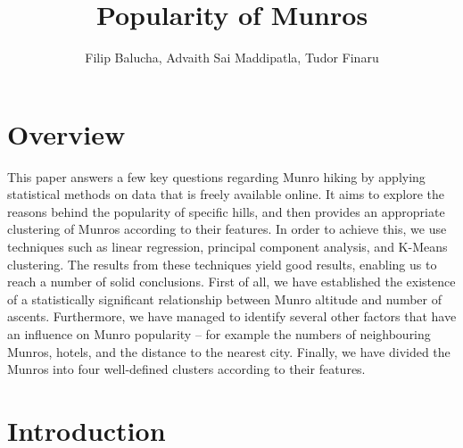 \documentclass[11pt,a4paper]{article}
\title{Popularity of Munros}
\author{Filip Balucha, Advaith Sai Maddipatla, Tudor Finaru}
\begin{document}
\maketitle


\section{Overview}
This paper answers a few key questions regarding Munro hiking by applying statistical methods on data that is freely available online. It aims to explore the reasons behind the popularity of specific hills, and then provides an appropriate clustering of Munros according to their features. In order to achieve this, we use techniques such as linear regression, principal component analysis, and K-Means clustering. The results from these techniques yield good results, enabling us to reach a number of solid conclusions. First of all, we have established the existence of a statistically significant relationship between Munro altitude and number of ascents. Furthermore, we have managed to identify several other factors that have an influence on Munro popularity – for example the numbers of neighbouring Munros, hotels, and the distance to the nearest city. Finally, we have divided the Munros into four well-defined clusters according to their features.

\section{Introduction}
\end{document}
